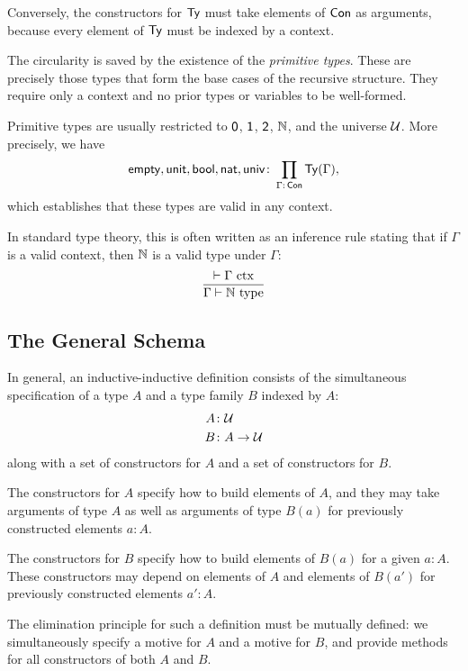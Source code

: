 \begin{xmpl} {}
    Conversely, the constructors for $\mathsf{Ty}$ must take elements of $\mathsf{Con}$ as arguments, because every element of $\mathsf{Ty}$ must be indexed by a context. 

    The circularity is saved by the existence of the \textsl{primitive types}. These are precisely those types that form the base cases of the recursive structure. They require only a context and no prior types or variables to be well-formed.
    
    Primitive types are usually restricted to $\mathsf{0}$, $\mathsf{1}$, $\mathsf{2}$, $\mathbb{N}$, and the universe $\mathcal U$. More precisely, we have
    \[
        \fun{empty},
        \fun{unit},
        \fun{bool},
        \fun{nat},
        \fun{univ}
            \colon\prod_{\Gamma\colon\fun{Con}}
                \fun{Ty}(\Gamma),
    \]
    which establishes that these types are valid in any context.

    In standard type theory, this is often written as an inference rule stating that if $\Gamma$ is a valid context, then $\mathbb{N}$ is a valid type under $\Gamma$:
    \[
        \frac{\vdash\Gamma\text{ ctx}}
            {\Gamma\vdash\mathbb{N}\text{ type}}
    \]
\end{xmpl}

\subsection*{The General Schema}

In general, an inductive-inductive definition consists of the simultaneous specification of a type $A$ and a type family $B$ indexed by $A$:
\begin{align*}
    A &\colon \univ \\
    B &\colon A \to \univ
\end{align*}
along with a set of constructors for $A$ and a set of constructors for $B$. 

The constructors for $A$ specify how to build elements of $A$, and they may take arguments of type $A$ as well as arguments of type $B(a)$ for previously constructed elements $a \colon A$.

The constructors for $B$ specify how to build elements of $B(a)$ for a given $a \colon A$. These constructors may depend on elements of $A$ and elements of $B(a')$ for previously constructed elements $a' \colon A$.

The elimination principle for such a definition must be mutually defined: we simultaneously specify a motive for $A$ and a motive for $B$, and provide methods for all constructors of both $A$ and $B$.

